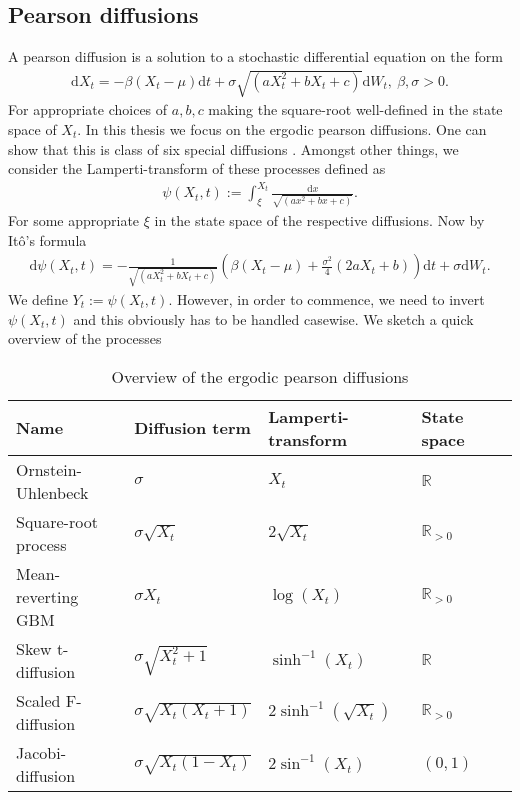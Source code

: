 \subsection{Pearson diffusions}
A pearson diffusion is a solution to a stochastic differential equation on the form
\begin{align}
    \mathrm{d}X_t = -\beta \left(X_t - \mu\right)\mathrm{d}t + \sigma\sqrt{\left(aX_t^2 + bX_t + c\right)}\mathrm{d}W_t, \: \beta, \sigma > 0. \label{eq:pearsonDiffusion}
\end{align}
For appropriate choices of $a, b, c$ making the square-root well-defined in the state space of $X_t$. In this thesis we focus on the ergodic pearson diffusions. One can show that this is class of six special diffusions \cite[p.36]{StatisticalMethodsForSDE}. Amongst other things, we consider the Lamperti-transform of these processes defined as
\begin{align}
    \psi\left(X_t, t\right) := \int_{\xi}^{X_t} \frac{\mathrm{d}x}{\sqrt{\left(ax^2 + bx + c\right)}}. \label{eq:lampertiDefinition}
\end{align}
For some appropriate $\xi$ in the state space of the respective diffusions. Now by Itô's formula
\begin{align}
    \mathrm{d}\psi\left(X_t, t\right) = - \frac{1}{\sqrt{\left(aX_t^2 + bX_t + c\right)}}\left(\beta\left(X_t - \mu\right) + \frac{\sigma^2}{4}\left(2aX_t + b\right)\right)\mathrm{d}t + \sigma \mathrm{d}W_t.
\end{align}
We define $Y_t := \psi\left(X_t, t\right)$. However, in order to commence, we need to invert $\psi\left(X_t, t\right)$ and this obviously has to be handled casewise. We sketch a quick overview of the processes
\begin{table}[h!]
    \begin{center}
    \begin{tabular}{lllll}\hline
    \textbf{Name} & \textbf{Diffusion term} & \textbf{Lamperti-transform} & \textbf{State space}\\ \hline
    Ornstein-Uhlenbeck  & $\sigma$  & $X_t$ & $\mathbb{R}$ \\
    Square-root process & $\sigma\sqrt{X_t}$  & $ 2\sqrt{X_t}$ & $\mathbb{R}_{>0}$ \\
    Mean-reverting GBM  & $\sigma X_t $  & $ \log\left(X_t\right)$  & $\mathbb{R}_{>0}$ \\
    Skew t-diffusion  & $\sigma\sqrt{X_t^2 + 1}$  & $ \sinh^{-1}(X_t)$ & $\mathbb{R}$\\
    Scaled F-diffusion  & $\sigma\sqrt{X_t\left(X_t + 1\right)}$  & $ 2\sinh^{-1}\left(\sqrt{X_t}\right)$ & $\mathbb{R}_{>0}$ \\
    Jacobi-diffusion  & $\sigma\sqrt{X_t\left(1 - X_t\right)}$  & $ 2\sin^{-1}\left(X_t\right)$ & $(0, 1)$ \\ \hline
    \end{tabular}
    \caption{Overview of the ergodic pearson diffusions}
\end{center}
\end{table}\\

